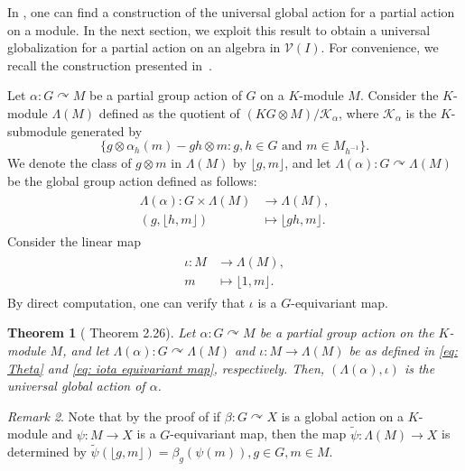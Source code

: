 \documentclass[11pt]{amsart}
\numberwithin{equation}{section}
\newtheorem{theorem}{Theorem}[section] %
\theoremstyle{definition}
\theoremstyle{remark}
\newtheorem{remark}[theorem]{Remark}
\begin{document}
In \cite[Theorem 2.26]{Article_Jerez_2024_OTHOPGA}, one can find a construction of the universal global action for a partial action on a module.  In the next section, we exploit this result to obtain a universal globalization for a partial action on an algebra in \( \mathcal{V}(I) \). For convenience, we recall the construction presented in~\cite{Article_Jerez_2024_OTHOPGA}.

Let \( \alpha: G \curvearrowright M \) be a partial group action of \( G \) on a \( K \)-module \( M \). Consider the \( K \)-module \( \Lambda(M) \) defined as the quotient of \(  (KG \otimes M) /\mathcal{K}_{\alpha}\), where \(\mathcal{K}_{\alpha}\) is the \( K \)-submodule generated by
\[
    \{ g \otimes \alpha_h(m) - gh \otimes m : g, h \in G \text{ and } m \in M_{h^{-1}} \}.
\]
We denote the class of \( g \otimes m \) in \( \Lambda(M) \) by \( \lfloor g, m \rfloor \), and let \( \Lambda(\alpha): G \curvearrowright \Lambda(M) \) be the global group action defined as follows:
\begin{align} \label{eq: Theta}
    \begin{split}
        \Lambda(\alpha): G \times \Lambda(M) &\to \Lambda(M), \\
        (g, \lfloor h, m \rfloor) &\mapsto \lfloor gh, m \rfloor.
    \end{split}
\end{align}
Consider the linear map
\begin{align} \label{eq: iota equivariant map}
    \begin{split}
        \iota: M &\to \Lambda(M), \\
        m &\mapsto \lfloor 1, m \rfloor.
    \end{split}
\end{align}
By direct computation, one can verify that \( \iota \) is a \( G \)-equivariant map.

\begin{theorem}[\hspace{-3pt} Theorem 2.26\cite{Article_Jerez_2024_OTHOPGA}] \label{t: universal global action}
    Let \( \alpha: G \curvearrowright M \) be a partial group action on the \( K \)-module \( M \), and let \( \Lambda(\alpha): G \curvearrowright \Lambda(M) \) and \( \iota: M \to \Lambda(M) \) be as defined in \eqref{eq: Theta} and \eqref{eq: iota equivariant map}, respectively. Then, \( (\Lambda(\alpha), \iota) \) is the universal global action of \( \alpha \).
\end{theorem}

\begin{remark} Note that by the proof of \cite[Theorem 2.26]{Article_Jerez_2024_OTHOPGA} if   \( \beta: G \curvearrowright X \) is a global action on a \( K \)-module and  \( \psi: M \to X \) is a  
    \( G \)-equivariant map, then the map \( \widetilde{\psi}: \Lambda(M) \to X \) is determined by $ \widetilde{\psi} (\lfloor g, m \rfloor) = \beta_g ( \psi(m)), g\in G, m \in M.$
\end{remark}
\end{document}
